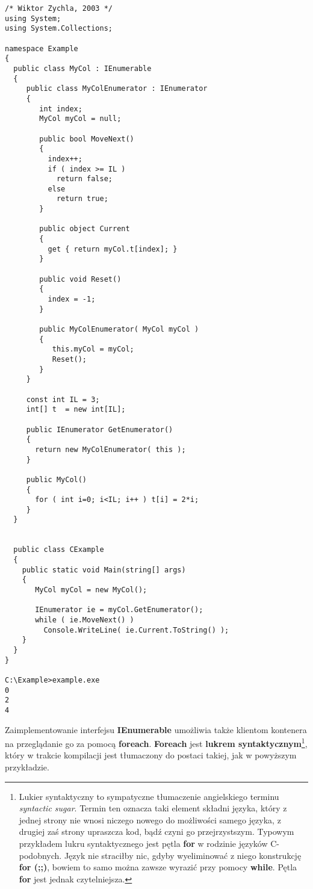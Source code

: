 \begin{scriptsize}
\begin{verbatim}
/* Wiktor Zychla, 2003 */
using System;
using System.Collections;

namespace Example
{
  public class MyCol : IEnumerable
  {
     public class MyColEnumerator : IEnumerator
     {
        int index;
        MyCol myCol = null;

        public bool MoveNext()
        {
          index++;
          if ( index >= IL ) 
            return false;
          else
            return true;
        }     

        public object Current
        {
          get { return myCol.t[index]; }
        }
 
        public void Reset()
        {
          index = -1;
        }

        public MyColEnumerator( MyCol myCol )
        {
           this.myCol = myCol;
           Reset();
        }        
     } 

     const int IL = 3;
     int[] t  = new int[IL];

     public IEnumerator GetEnumerator()
     {
       return new MyColEnumerator( this );
     }     

     public MyCol() 
     {
       for ( int i=0; i<IL; i++ ) t[i] = 2*i;
     }
  }


  public class CExample 
  {
    public static void Main(string[] args)
    {
       MyCol myCol = new MyCol();

       IEnumerator ie = myCol.GetEnumerator();
       while ( ie.MoveNext() )
         Console.WriteLine( ie.Current.ToString() );
    }
  }
}

C:\Example>example.exe
0
2
4
\end{verbatim}
\end{scriptsize}

Zaimplementowanie interfejsu {\bf IEnumerable} umożliwia także klientom kontenera na przeglądanie go
za pomocą {\bf foreach}. {\bf Foreach} jest {\bf lukrem syntaktycznym}\footnote{Lukier
syntaktyczny to sympatyczne tłumaczenie angielskiego terminu {\em syntactic sugar}. Termin ten
oznacza taki element składni języka, który z jednej strony nie wnosi niczego nowego do możliwości samego języka, 
z drugiej zaś strony upraszcza kod, bądź czyni go przejrzystszym. Typowym przykładem lukru syntaktycznego
jest pętla {\bf for} w rodzinie języków C-podobnych. Język nie straciłby nic, gdyby wyeliminować z niego
konstrukcję {\bf for (;;)}, bowiem to samo można zawsze wyrazić przy pomocy {\bf while}. Pętla {\bf for}
jest jednak czytelniejsza.}, który w trakcie kompilacji jest tłumaczony do postaci takiej, jak 
w powyższym przykładzie. 

